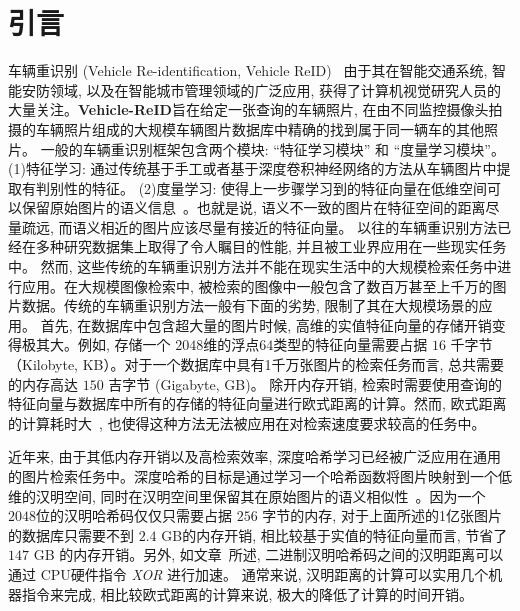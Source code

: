 \section{引言}
车辆重识别 (Vehicle Re-identification, Vehicle ReID)~\cite{liu2016deep, liu2017beyond, yan2017exploiting, guo2018learning, lou2019embedding, meng2020parsing} 由于其在智能交通系统, 智能安防领域, 以及在智能城市管理领域的广泛应用, 获得了计算机视觉研究人员的大量关注。\textbf{Vehicle-ReID}旨在给定一张查询的车辆照片, 在由不同监控摄像头拍摄的车辆照片组成的大规模车辆图片数据库中精确的找到属于同一辆车的其他照片。 一般的车辆重识别框架包含两个模块: ``特征学习模块'' 和 ``度量学习模块''。 (1)特征学习: 通过传统基于手工或者基于深度卷积神经网络的方法从车辆图片中提取有判别性的特征。 (2)度量学习: 使得上一步骤学习到的特征向量在低维空间可以保留原始图片的语义信息~\cite{chu2019vehicle}。也就是说, 语义不一致的图片在特征空间的距离尽量疏远, 而语义相近的图片应该尽量有接近的特征向量。 以往的车辆重识别方法已经在多种研究数据集上取得了令人瞩目的性能, 并且被工业界应用在一些现实任务中。 然而, 这些传统的车辆重识别方法并不能在现实生活中的大规模检索任务中进行应用。在大规模图像检索中, 被检索的图像中一般包含了数百万甚至上千万的图片数据。传统的车辆重识别方法一般有下面的劣势, 限制了其在大规模场景的应用。 首先, 在数据库中包含超大量的图片时候, 高维的实值特征向量的存储开销变得极其大。例如, 存储一个 $2048$维的浮点$64$类型的特征向量需要占据 $16$ 千字节（Kilobyte, KB）。对于一个数据库中具有1千万张图片的检索任务而言, 总共需要的内存高达 $150$ 吉字节 (Gigabyte, GB)。 除开内存开销, 检索时需要使用查询的特征向量与数据库中所有的存储的特征向量进行欧式距离的计算。然而, 欧式距离的计算耗时大~\cite{lin2015deep}, 也使得这种方法无法被应用在对检索速度要求较高的任务中。\par
近年来, 由于其低内存开销以及高检索效率, 深度哈希学习已经被广泛应用在通用的图片检索任务中。深度哈希的目标是通过学习一个哈希函数将图片映射到一个低维的汉明空间, 同时在汉明空间里保留其在原始图片的语义相似性~\cite{lin2015deep, cakir2019hashing, cao2016correlation, cao2017hashnet}。因为一个 $2048$位的汉明哈希码仅仅只需要占据 $256$ 字节的内存, 对于上面所述的1亿张图片的数据库只需要不到 $2.4$ GB的内存开销, 相比较基于实值的特征向量而言, 节省了 $147$ GB 的内存开销。另外, 如文章~\cite{ong2016improved}所述, 二进制汉明哈希码之间的汉明距离可以通过 CPU硬件指令 \textit{XOR} 进行加速。 通常来说, 汉明距离的计算可以实用几个机器指令来完成, 相比较欧式距离的计算来说, 极大的降低了计算的时间开销。 \par

